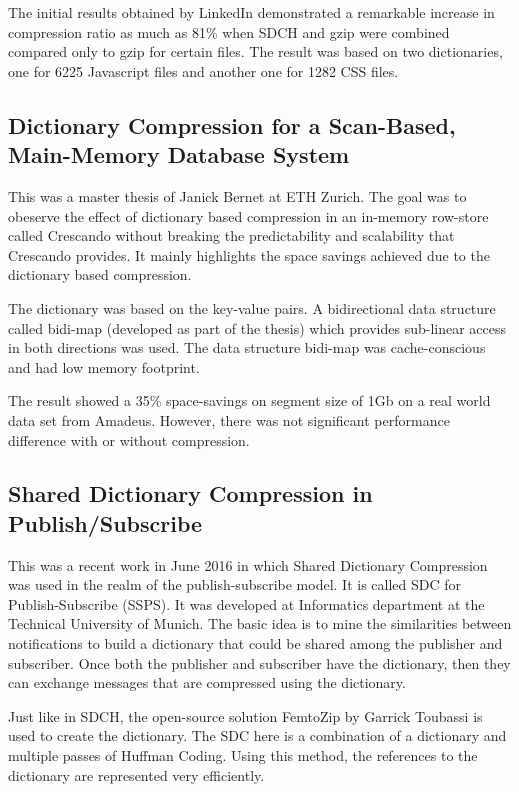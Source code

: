 The initial results obtained by LinkedIn demonstrated a remarkable increase in compression ratio as much as 81\% when SDCH and gzip were combined compared only to gzip for certain files. The result was based on two dictionaries, one for 6225 Javascript files and another one for 1282 CSS files. 

\subsection{Dictionary Compression for a Scan-Based, Main-Memory Database System}

This was a master thesis of Janick Bernet at ETH Zurich. The goal was to obeserve the effect of dictionary based compression in an in-memory row-store called Crescando \parencite{crescando} without breaking the predictability and scalability that Crescando provides. It mainly highlights the space savings achieved due to the dictionary based compression.

The dictionary was based on the key-value pairs. A bidirectional data structure called bidi-map (developed as part of the thesis) which provides sub-linear access in both directions was used. The data structure bidi-map was cache-conscious and had low memory footprint. 

The result showed a 35\% space-savings on segment size of 1Gb on a real world data set from Amadeus. However, there was not significant performance difference with or without compression. 

\subsection{Shared Dictionary Compression in Publish/Subscribe}

This was a recent work in June 2016 in which Shared Dictionary Compression was used in the realm of the publish-subscribe model. It is called SDC for Publish-Subscribe (SSPS). It was developed at Informatics department at the Technical University of Munich. The basic idea is to mine the similarities between notifications to build a dictionary that could be shared among the publisher and subscriber. Once both the publisher and subscriber have the dictionary, then they can exchange messages that are compressed using the dictionary.

Just like in SDCH, the open-source solution FemtoZip by Garrick Toubassi is used to create the dictionary. The SDC here is a combination of a dictionary and multiple passes of Huffman Coding. Using this method, the references to the dictionary are represented very efficiently.

